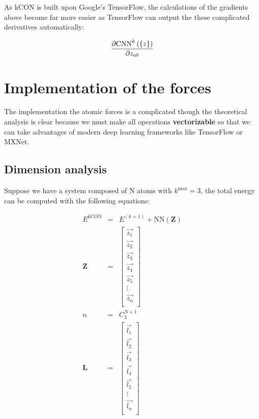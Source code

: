 As kCON is built upon Google's TensorFlow, the calculations of the gradients above become 
far more easier as TensorFlow can output the these complicated derivatives automatically:

\begin{eqnarray}
\frac{
	\partial{\boldmath{\mathrm{CNN}}^{k}\left(\left\{ z \right\} \right)}
}{
	\partial{z_{ab}}
}	
\end{eqnarray}

\section{Implementation of the forces}

The implementation the atomic forces is a complicated though the theoretical analysis is 
clear because we must make all operations \textbf{vectorizable} so that we can take
advantages of modern deep learning frameworks like TensorFlow or MXNet. 

\subsection{Dimension analysis}

Suppose we have a system composed of N atoms with $k^\mathrm{max}=3$, the total energy can be 
computed with the following equations:

\begin{eqnarray}
	E^{\mathrm{kCON}} & = & E^{(k=1)} + \mathrm{NN}(\boldsymbol{Z}) \\
	\boldsymbol{Z} & = & \left[
		\begin{array}{c}
			\vec{z_{1}}  \\
			\vec{z_{2}}  \\
			\vec{z_{3}}  \\
			\vec{z_{4}}  \\
			\vec{z_{5}}  \\
			\vdots \\
			\vec{z_{n}}  \\
		\end{array}
	\right]                                                         \\
	n & = & C^{N + 1}_3                                             \\
	\boldsymbol{L} & = & \left[
		\begin{array}{c}
			\vec{l_{1}}  \\
			\vec{l_{2}}  \\
			\vec{l_{3}}  \\
			\vec{l_{4}}  \\
			\vec{l_{5}}  \\
			\vdots \\
			\vec{l_{n}}  \\			
		\end{array}
	\right]
\end{eqnarray}

